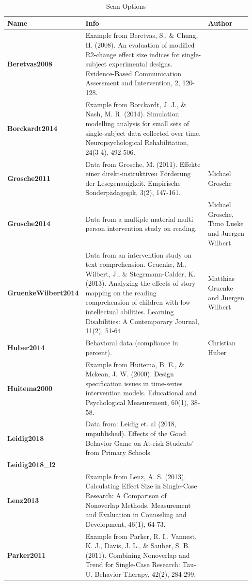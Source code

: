 \documentclass[
]{book}
\begin{document}
\begin{table}

\caption{\label{tab:scanex}Scan Options}
\begin{tabular}[t]{>{\raggedright\arraybackslash}p{7em}>{\raggedright\arraybackslash}p{20em}l}
\toprule
Name & Info & Author\\
\midrule
\textbf{Beretvas2008} & Example from Beretvas, S., \& Chung, H. (2008). An evaluation of modified R2-change effect size indices for single-subject experimental designs. Evidence-Based Communication Assessment and Intervention, 2, 120-128. & \\
\textbf{Borckardt2014} & Example from Borckardt, J. J., \& Nash, M. R. (2014). Simulation modelling analysis for small sets of single-subject data collected over time. Neuropsychological Rehabilitation, 24(3-4), 492-506. & \\
\textbf{Grosche2011} & Data from Grosche, M. (2011). Effekte einer direkt-instruktiven Förderung der Lesegenauigkeit. Empirische Sonderpädagogik, 3(2), 147-161. & Michael Grosche\\
\textbf{Grosche2014} & Data from a multiple material multi person intervention study on reading. & Michael Grosche, Timo Lueke and Juergen Wilbert\\
\textbf{GruenkeWilbert2014} & Data from an intervention study on text comprehension. Gruenke, M., Wilbert, J., \& Stegemann-Calder, K. (2013). Analyzing the effects of story mapping on the reading comprehension of children with low intellectual abilities. Learning Disabilities: A Contemporary Journal, 11(2), 51-64. & Matthias Gruenke and Juergen Wilbert\\
\textbf{Huber2014} & Behavioral data (compliance in percent). & Christian Huber\\
\textbf{Huitema2000} & Example from Huitema, B. E., \& Mckean, J. W. (2000). Design specification issues in time-series intervention models. Educational and Psychological Measurement, 60(1), 38-58. & \\
\textbf{Leidig2018} & Data from: Leidig et. al (2018, unpublished). Effects of the Good Behavior Game on At-risk Students' from Primary Schools & \\
\textbf{Leidig2018\_l2} &  & \\
\textbf{Lenz2013} & Example from Lenz, A. S. (2013). Calculating Effect Size in Single-Case Research: A Comparison of Nonoverlap Methods. Measurement and Evaluation in Counseling and Development, 46(1), 64-73. & \\
\textbf{Parker2011} & Example from Parker, R. I., Vannest, K. J., Davis, J. L., \& Sauber, S. B. (2011). Combining Nonoverlap and Trend for Single-Case Research: Tau-U. Behavior Therapy, 42(2), 284-299. & \\

\end{tabular}
\end{table}
\end{document}
